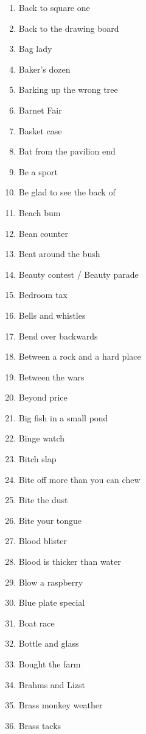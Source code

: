 \begin{enumerate}
        \item  Back to square one
        \item  Back to the drawing board
        \item  Bag lady
        \item  Baker's dozen
        \item  Barking up the wrong tree
        \item  Barnet Fair
        \item  Basket case
        \item  Bat from the pavilion end
        \item  Be a sport
        \item  Be glad to see the back of
        \item  Beach bum
        \item  Bean counter
        \item  Beat around the bush
        \item  Beauty contest / Beauty parade
        \item  Bedroom tax
        \item  Bells and whistles
        \item  Bend over backwards
        \item  Between a rock and a hard place
        \item  Between the wars
        \item  Beyond price
        \item  Big fish in a small pond
        \item  Binge watch
        \item  Bitch slap
        \item  Bite off more than you can chew
        \item  Bite the dust
        \item  Bite your tongue
        \item  Blood blister
        \item  Blood is thicker than water
        \item  Blow a raspberry
        \item  Blue plate special
        \item  Boat race
        \item  Bottle and glass
        \item  Bought the farm
        \item  Brahms and Lizst
        \item  Brass monkey weather
        \item  Brass tacks

\end{enumerate}
